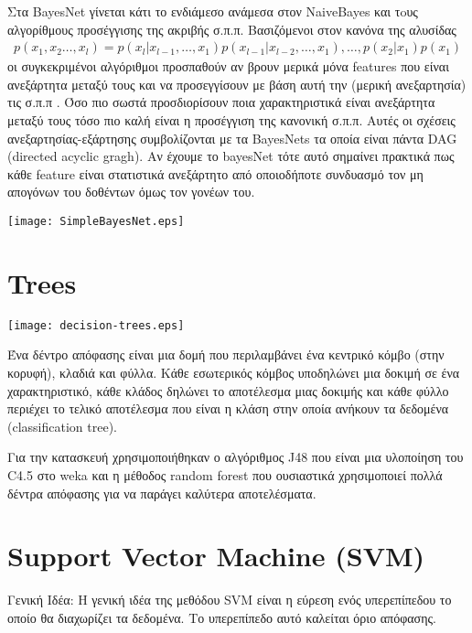 Στα BayesΝet γίνεται κάτι το ενδιάμεσο ανάμεσα στον NaiveBayes και τoυς αλγορίθμους προσέγγισης της ακριβής σ.π.π. 
Βασιζόμενοι στον κανόνα της αλυσίδας
\begin{align*}
p(x_1,x_2 \ldots ,x_l) = p(x_l|x_{l-1},\ldots,x_1)p(x_{l-1}|x_{l-2},\ldots,x_1),\ldots,p(x_2|x_1)p(x_1)
\end{align*} 
οι συγκεκριμένοι αλγόριθμοι προσπαθούν αν βρουν μερικά μόνα features που είναι ανεξάρτητα μεταξύ τους και να προσεγγίσουν με βάση αυτή την (μερική ανεξαρτησία) τις σ.π.π .
Όσο πιο σωστά προσδιορίσουν ποια χαρακτηριστικά είναι ανεξάρτητα μεταξύ τους τόσο πιο καλή είναι η προσέγγιση της κανονική σ.π.π.
Αυτές οι σχέσεις ανεξαρτησίας-εξάρτησης συμβολίζονται με τα BayesNets τα οποία είναι πάντα DAG (directed acyclic gragh).
Αν έχουμε το bayesNet τότε αυτό σημαίνει πρακτικά πως κάθε feature  είναι στατιστικά ανεξάρτητο από οποιοδήποτε συνδυασμό τον μη απογόνων του δοθέντων όμως τον γονέων του.

\begin{center}
	\texttt{[image: SimpleBayesNet.eps]}
	\label{fig:BayesNet}  
\end{center}

\section{Trees}
\begin{center}
    \texttt{[image: decision-trees.eps]}
    \label{fig:decision-tree}
\end{center}

Ένα δέντρο απόφασης είναι μια δομή που περιλαμβάνει ένα κεντρικό κόμβο (στην κορυφή), κλαδιά και φύλλα.
Κάθε εσωτερικός κόμβος υποδηλώνει μια δοκιμή σε ένα χαρακτηριστικό,
κάθε κλάδος δηλώνει το αποτέλεσμα μιας δοκιμής
και κάθε φύλλο περιέχει το τελικό αποτέλεσμα που είναι η κλάση στην οποία ανήκουν τα δεδομένα (classification tree).

Για την κατασκευή χρησιμοποιήθηκαν ο αλγόριθμος J48 που είναι μια υλοποίηση του C4.5 στο weka
και η μέθοδος random forest που ουσιαστικά χρησιμοποιεί πολλά δέντρα απόφασης για να παράγει καλύτερα αποτελέσματα.



\section{Support Vector Machine (SVM)}
Γενική Ιδέα:
H γενική ιδέα της μεθόδου SVM είναι η εύρεση ενός υπερεπίπεδου το οποίο θα διαχωρίζει τα δεδομένα.
Το υπερεπίπεδο αυτό καλείται όριο απόφασης. 

